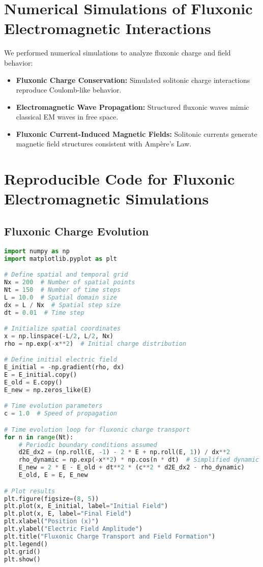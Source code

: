 \documentclass{article}
\begin{document}
\section{Numerical Simulations of Fluxonic Electromagnetic Interactions}
We performed numerical simulations to analyze fluxonic charge and field behavior:
\begin{itemize}
    \item \textbf{Fluxonic Charge Conservation:} Simulated solitonic charge interactions reproduce Coulomb-like behavior.
    \item \textbf{Electromagnetic Wave Propagation:} Structured fluxonic waves mimic classical EM waves in free space.
    \item \textbf{Fluxonic Current-Induced Magnetic Fields:} Solitonic currents generate magnetic field structures consistent with Ampère’s Law.
\end{itemize}

\section{Reproducible Code for Fluxonic Electromagnetic Simulations}
\subsection{Fluxonic Charge Evolution}
\begin{lstlisting}[language=Python, caption=Fluxonic Charge Evolution, label=lst:charge]
import numpy as np
import matplotlib.pyplot as plt

# Define spatial and temporal grid
Nx = 200  # Number of spatial points
Nt = 150  # Number of time steps
L = 10.0  # Spatial domain size
dx = L / Nx  # Spatial step size
dt = 0.01  # Time step

# Initialize spatial coordinates
x = np.linspace(-L/2, L/2, Nx)
rho = np.exp(-x**2)  # Initial charge distribution

# Define initial electric field
E_initial = -np.gradient(rho, dx)
E = E_initial.copy()
E_old = E.copy()
E_new = np.zeros_like(E)

# Time evolution parameters
c = 1.0  # Speed of propagation

# Time evolution loop for fluxonic charge transport
for n in range(Nt):
    # Periodic boundary conditions assumed
    d2E_dx2 = (np.roll(E, -1) - 2 * E + np.roll(E, 1)) / dx**2
    rho_dynamic = np.exp(-x**2) * np.cos(n * dt)  # Simplified dynamic charge
    E_new = 2 * E - E_old + dt**2 * (c**2 * d2E_dx2 - rho_dynamic)
    E_old, E = E, E_new

# Plot results
plt.figure(figsize=(8, 5))
plt.plot(x, E_initial, label="Initial Field")
plt.plot(x, E, label="Final Field")
plt.xlabel("Position (x)")
plt.ylabel("Electric Field Amplitude")
plt.title("Fluxonic Charge Transport and Field Formation")
plt.legend()
plt.grid()
plt.show()
\end{lstlisting}
\end{document}

